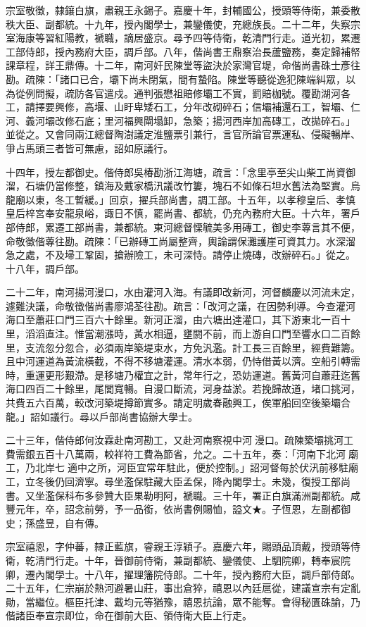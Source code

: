 \begin{pinyinscope}
宗室敬徵，隸鑲白旗，肅親王永錫子。嘉慶十年，封輔國公，授頭等侍衛，兼委散秩大臣、副都統。十九年，授內閣學士，兼鑾儀使，充總族長。二十二年，失察宗室海康等習紅陽教，褫職，謫居盛京。尋予四等侍衛，乾清門行走。道光初，累遷工部侍郎，授內務府大臣，調戶部。八年，偕尚書王鼎察治長蘆鹽務，奏定歸補帑課章程，詳王鼎傳。十二年，南河奸民陳堂等盜決於家灣官堤，命偕尚書硃士彥往勘。疏陳：「諸口已合，壩下尚未閉氣，間有蟄陷。陳堂等聽從逸犯陳端糾眾，以為從例問擬，疏防各官遣戍。通判張懋祖賠修壩工不實，罰賠枷號。覆勘湖河各工，請擇要興修，高堰、山盱卑矮石工，分年改砌碎石；信壩補還石工，智壩、仁河、義河壩改修石底；里河福興閘塌卸，急築；揚河西岸加高磚工，改拋碎石。」並從之。又會同兩江總督陶澍議定淮鹽票引兼行，言官所論官票運私、侵礙暢岸、爭占馬頭三者皆可無慮，詔如原議行。

十四年，授左都御史。偕侍郎吳椿勘浙江海塘，疏言：「念里亭至尖山柴工尚資御溜，石塘仍當修整，鎮海及戴家橋汛議改竹簍，塊石不如條石坦水舊法為堅實。烏龍廟以東，冬工暫緩。」回京，擢兵部尚書，調工部。十五年，以孝穆皇后、孝慎皇后梓宮奉安龍泉峪，諏日不慎，罷尚書、都統，仍充內務府大臣。十六年，署戶部侍郎，累遷工部尚書，兼都統。東河總督慄毓美多用磚工，御史李蓴言其不便，命敬徵偕蓴往勘。疏陳：「已辦磚工尚屬整齊，輿論謂保灘護崖可資其力。水深溜急之處，不及埽工鞏固，搶辦險工，未可深恃。請停止燒磚，改辦碎石。」從之。十八年，調戶部。

二十二年，南河揚河漫口，水由灌河入海。有議即改新河，河督麟慶以河流未定，遽難決議，命敬徵偕尚書廖鴻荃往勘。疏言：「改河之議，在因勢利導。今查灌河海口至蕭莊口門三百六十餘里。新河正溜，由六塘出達灌口，其下游東北一百十里，滔滔直注。惟當潮漲時，黃水相逼，壅閼不前，而上游自口門至響水口二百餘里，支流忽分忽合，必須兩岸築堤束水，方免汎濫。計工長三百餘里，經費難籌。且中河運道為黃流橫截，不得不移塘灌運。清水本弱，仍恃借黃以濟。空船引轉需時，重運更形艱滯。是移塘乃權宜之計，常年行之，恐妨運道。舊黃河自蕭莊迄舊海口四百二十餘里，尾閭寬暢。自漫口斷流，河身益淤。若挽歸故道，堵口挑河，共費五六百萬，較改河築堤撙節實多。請定明歲春融興工，俟軍船回空後築壩合龍。」詔如議行。尋以戶部尚書協辦大學士。

二十三年，偕侍郎何汝霖赴南河勘工，又赴河南察視中河漫口。疏陳築壩挑河工費需銀五百十八萬兩，較祥符工費為節省，允之。二十五年，奏：「河南下北河廟工，乃北岸七適中之所，河臣宜常年駐此，便於控制。」詔河督每於伏汛前移駐廟工，立冬後仍回濟寧。尋坐濫保駐藏大臣孟保，降內閣學士。未幾，復授工部尚書。又坐濫保科布多參贊大臣果勒明阿，褫職。三十年，署正白旗滿洲副都統。咸豐元年，卒，詔念前勞，予一品銜，依尚書例賜恤，謚文★。子恆恩，左副都御史；孫盛昱，自有傳。

宗室禧恩，字仲蕃，隸正藍旗，睿親王淳穎子。嘉慶六年，賜頭品頂戴，授頭等侍衛，乾清門行走。十年，晉御前侍衛，兼副都統、鑾儀使、上駟院卿，轉奉宸院卿，遷內閣學士。十八年，擢理籓院侍郎。二十年，授內務府大臣，調戶部侍郎。二十五年，仁宗崩於熱河避暑山莊，事出倉猝，禧恩以內廷扈從，建議宣宗有定亂勛，當繼位。樞臣托津、戴均元等猶豫，禧恩抗論，眾不能奪。會得秘匱硃諭，乃偕諸臣奉宣宗即位，命在御前大臣、領侍衛大臣上行走。


\end{pinyinscope}
